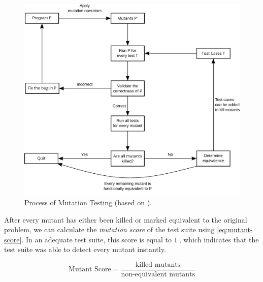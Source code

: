 \begin{figure}[htbp!]
	\centering
	\includegraphics[width=\textwidth]{assets/images/mutation-testing.pdf}
	\caption{Process of Mutation Testing (based on \cite{Offutt2001}).}
	\label{fig:mutation-testing}
\end{figure}

\noindent After every mutant has either been killed or marked equivalent to the original problem, we can calculate the \emph{mutation score} of the test suite using \cref{eq:mutant-score}. In an adequate test suite, this score is equal to $\SI{1}{}$, which indicates that the test suite was able to detect every mutant instantly.

\begin{equation}\label{eq:mutant-score}
	\text{Mutant Score} = \frac{\text{killed mutants}}{\text{non-equivalent mutants}}
\end{equation}

